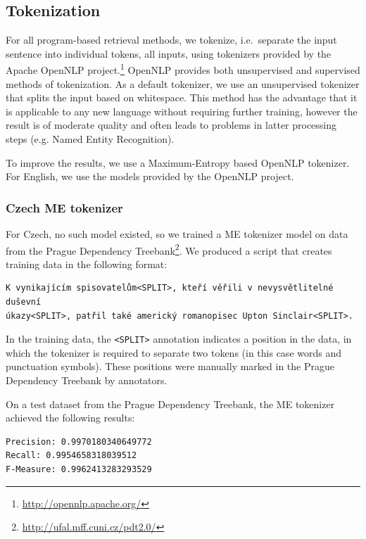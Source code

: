\subsection{Tokenization}

For all program-based retrieval methods, we tokenize, i.e.\ separate the input sentence into individual tokens,
all inputs, using tokenizers provided by the Apache OpenNLP project.\footnote{\url{http://opennlp.apache.org/}}
OpenNLP provides both unsupervised and supervised methods of tokenization. 
As a default tokenizer, we use an unsupervised tokenizer that splits the input
based on whitespace. This method has the advantage that it is applicable to any new
language without requiring further training, however the result is of moderate
quality and often leads to problems in latter processing steps (e.g. Named Entity Recognition).

To improve the results, we use a Maximum-Entropy based OpenNLP tokenizer. For English, we use the
models provided by the OpenNLP project. 


\subsubsection*{Czech ME tokenizer}

For Czech, no such model existed, so we trained a ME tokenizer
model on data from the Prague Dependency Treebank\footnote{\url{http://ufal.mff.cuni.cz/pdt2.0/}}. We produced a script that creates training data in the following format:
\begin{verbatim}
K vynikajícím spisovatelům<SPLIT>, kteří věřili v nevysvětlitelné duševní 
úkazy<SPLIT>, patřil také americký romanopisec Upton Sinclair<SPLIT>.
\end{verbatim}

In the training data, the \verb|<SPLIT>| annotation indicates a position in the data, in which the
tokenizer is required to separate two tokens (in this case words and punctuation symbols). These
positions were manually marked in the Prague Dependency Treebank by annotators.

On a test dataset from the Prague Dependency Treebank, the ME tokenizer achieved the following results:

\begin{lstlisting}
Precision: 0.9970180340649772
Recall: 0.9954658318039512
F-Measure: 0.9962413283293529
\end{lstlisting}

